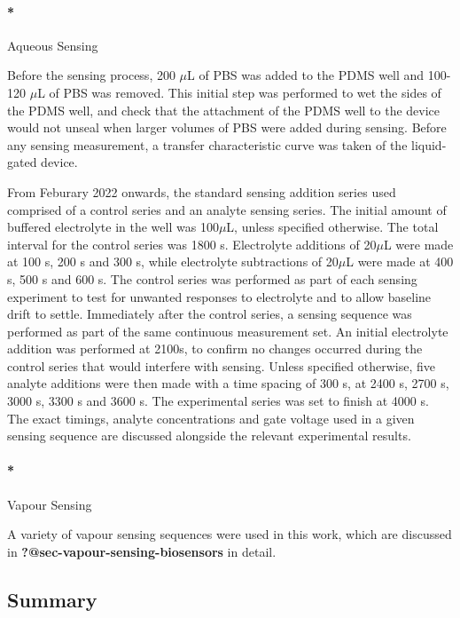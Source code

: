 \documentclass[
  letterpaper,
  DIV=11,
  numbers=noendperiod]{scrartcl}
\let\oldparagraph\paragraph
\renewcommand{\paragraph}[1]{\oldparagraph{#1}\mbox{}}
\begin{document}
\hypertarget{aqueous-sensing}{%
\paragraph*{Aqueous Sensing}\label{aqueous-sensing}}

Before the sensing process, 200 \(\mu\)L of PBS was added to the PDMS
well and 100-120 \(\mu\)L of PBS was removed. This initial step was
performed to wet the sides of the PDMS well, and check that the
attachment of the PDMS well to the device would not unseal when larger
volumes of PBS were added during sensing. Before any sensing
measurement, a transfer characteristic curve was taken of the
liquid-gated device.

From Feburary 2022 onwards, the standard sensing addition series used
comprised of a control series and an analyte sensing series. The initial
amount of buffered electrolyte in the well was 100\(\mu\)L, unless
specified otherwise. The total interval for the control series was 1800
s. Electrolyte additions of 20\(\mu\)L were made at 100 s, 200 s and 300
s, while electrolyte subtractions of 20\(\mu\)L were made at 400 s, 500
s and 600 s. The control series was performed as part of each sensing
experiment to test for unwanted responses to electrolyte and to allow
baseline drift to settle. Immediately after the control series, a
sensing sequence was performed as part of the same continuous
measurement set. An initial electrolyte addition was performed at 2100s,
to confirm no changes occurred during the control series that would
interfere with sensing. Unless specified otherwise, five analyte
additions were then made with a time spacing of 300 s, at 2400 s, 2700
s, 3000 s, 3300 s and 3600 s. The experimental series was set to finish
at 4000 s. The exact timings, analyte concentrations and gate voltage
used in a given sensing sequence are discussed alongside the relevant
experimental results.

\hypertarget{vapour-sensing}{%
\paragraph*{Vapour Sensing}\label{vapour-sensing}}

A variety of vapour sensing sequences were used in this work, which are
discussed in \textbf{?@sec-vapour-sensing-biosensors} in detail.

\hypertarget{summary}{%
\subsection{Summary}\label{summary}}
\end{document}
